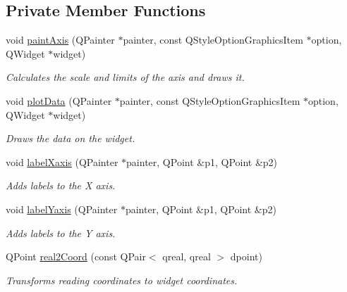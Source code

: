 \subsection*{Private Member Functions}
\begin{DoxyCompactItemize}
\item 
void \hyperlink{classplot_graph_a9237c8835c854dfe3156d4a5803663ab}{paint\-Axis} (Q\-Painter $\ast$painter, const Q\-Style\-Option\-Graphics\-Item $\ast$option, Q\-Widget $\ast$widget)
\begin{DoxyCompactList}\small\item\em Calculates the scale and limits of the axis and draws it. \end{DoxyCompactList}\item 
void \hyperlink{classplot_graph_a15feece3d49379208e40d2cd1b560787}{plot\-Data} (Q\-Painter $\ast$painter, const Q\-Style\-Option\-Graphics\-Item $\ast$option, Q\-Widget $\ast$widget)
\begin{DoxyCompactList}\small\item\em Draws the data on the widget. \end{DoxyCompactList}\item 
void \hyperlink{classplot_graph_aafb4adc423d484284f192dee28b00b8a}{label\-Xaxis} (Q\-Painter $\ast$painter, Q\-Point \&p1, Q\-Point \&p2)
\begin{DoxyCompactList}\small\item\em Adds labels to the X axis. \end{DoxyCompactList}\item 
void \hyperlink{classplot_graph_a101e15e7b8cb1ca251e736777a091ee3}{label\-Yaxis} (Q\-Painter $\ast$painter, Q\-Point \&p1, Q\-Point \&p2)
\begin{DoxyCompactList}\small\item\em Adds labels to the Y axis. \end{DoxyCompactList}\item 
Q\-Point \hyperlink{classplot_graph_afecabc6fb684c043bef8f585eb7e0791}{real2\-Coord} (const Q\-Pair$<$ qreal, qreal $>$ dpoint)
\begin{DoxyCompactList}\small\item\em Transforms reading coordinates to widget coordinates. \end{DoxyCompactList}\end{DoxyCompactItemize}

